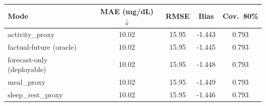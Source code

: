 \begin{tabular}{lcccc}
\toprule
Mode & MAE (mg/dL) $\downarrow$ & RMSE & Bias & Cov.~80\% \\
\midrule
activity\_proxy & 10.02 & 15.95 & -1.443 & 0.793 \\
factual-future (oracle) & 10.02 & 15.95 & -1.445 & 0.793 \\
forecast-only (deployable) & 10.02 & 15.95 & -1.448 & 0.793 \\
meal\_proxy & 10.02 & 15.95 & -1.449 & 0.793 \\
sleep\_rest\_proxy & 10.02 & 15.95 & -1.446 & 0.793 \\
\bottomrule
\end{tabular}
